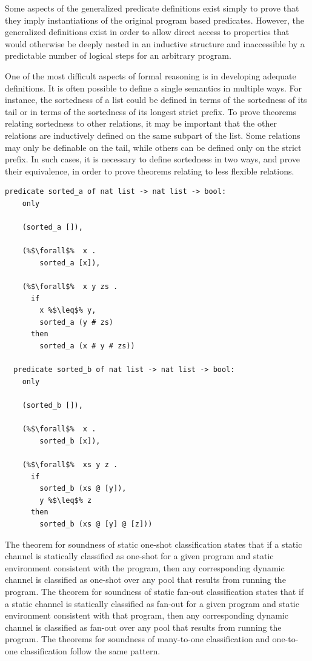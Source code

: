 \documentclass{article}
\begin{document}
Some aspects of the generalized predicate definitions exist simply to prove that they imply
instantiations of the original program based predicates. However, the generalized
definitions exist in order to allow direct access to properties that would
otherwise be deeply nested
in an inductive structure and inaccessible by a predictable number of
logical steps for an arbitrary
program.

One of the most difficult aspects of formal reasoning is in developing adequate definitions.
It is often possible to define a single semantics in multiple ways.
For instance, the sortedness of a list could be defined in terms of the sortedness of its tail
or in terms of the sortedness of its longest strict prefix. To prove theorems relating
sortedness to other relations, it may be important that the other relations are inductively
defined on the same subpart of the list. Some relations may only be definable on the tail,
while others can be defined only on the strict prefix. In such cases, it is necessary to
define sortedness in two ways, and prove their equivalence, in order to prove theorems relating
to less flexible relations.

\begin{lstlisting}[language=logic, escapechar=\%]
  predicate sorted_a of nat list -> nat list -> bool:
    only

    (sorted_a []),

    (%$\forall$%  x .
        sorted_a [x]),

    (%$\forall$%  x y zs .
      if 
        x %$\leq$% y,
        sorted_a (y # zs)
      then
        sorted_a (x # y # zs))

  predicate sorted_b of nat list -> nat list -> bool:
    only

    (sorted_b []),

    (%$\forall$%  x .
        sorted_b [x]),

    (%$\forall$%  xs y z .
      if 
        sorted_b (xs @ [y]),
        y %$\leq$% z 
      then
        sorted_b (xs @ [y] @ [z]))
  \end{lstlisting}

The theorem for soundness of static one-shot classification states that if a static channel is
statically classified as one-shot for a given program and
static environment consistent with the
program, then any corresponding dynamic channel is classified
as one-shot over any pool that results
from running the program. The theorem for soundness of
static fan-out classification states that if
a static channel is statically classified as fan-out for a given program and static environment
consistent with that program, then any corresponding dynamic channel is classified as fan-out
over any pool that results from running the program.  The theorems for soundness of many-to-one
classification and one-to-one classification follow the same pattern. 
\end{document}
